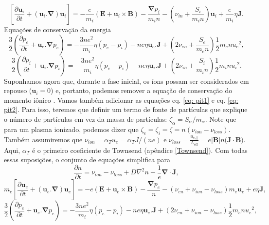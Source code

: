 \documentclass[12pt,oneside,a4paper]{abntex2}
\begin{document}
\begin{equation} 
\left[\frac{\partial \bm{u}_i}{\partial t} + (\bm{u}_i . \bm{\nabla})\bm{u}_i\right] = - \frac{e}{m_i} (\bm{E}+\bm{u}_i \times \bm{B}) - \frac{\bm{\nabla} p_i}{m_i n} - \left( \nu_{in}+\frac{S_i}{m_i n} \right) \bm{u}_i + \frac{e}{m_i}\eta \bm{J} . 
\end{equation}
Equações de conservação da energia
\begin{equation}
\frac{3}{2} \left(\frac{\partial p_e}{\partial t} + \bm{u}_e . \bm{\nabla} p_e\right) = -\frac{3ne^2}{m_i} \eta(p_e-p_i)-ne\eta \bm{u}_e.\bm{J}+\left(2 \nu_{en} + \frac{S_e}{m_e n}  \right) \frac{1}{2}m_en{u_e}^2,
\end{equation}
\begin{equation}
\frac{3}{2} \left(\frac{\partial p_i}{\partial t} + \bm{u}_i . \bm{\nabla} p_i\right) = -\frac{3ne^2}{m_i} \eta(p_e-p_i)-ne\eta \bm{u}_i.\bm{J}+\left( 2 \nu_{in} + \frac{S_i}{m_i n} \right)\frac{1}{2}m_in{u_i}^2 .
\end{equation}
Suponhamos agora que, durante a fase inicial, os íons possam ser considerados em repouso ($\bm{u}_i = 0$) e, portanto, podemos remover a equação de conservação do momento iônico \cite[pg. 402]{bittencourt}. 
Vamos também adicionar as equações eq. \ref{eq: pit1} e eq. \ref{eq: pit2}. 
Para isso, teremos que definir um termo de fonte de partículas que explique o número de partículas em vez da massa de partículas: $\zeta_\alpha = S_\alpha / m_\alpha$. Note que para um plasma ionizado, podemos dizer que $\zeta_e = \zeta_i = \zeta = n(\nu_{ion} - \nu_{loss})$. 
Também assumiremos que $\nu_{ion} = \alpha_T u_e = \alpha_T J / (ne)$ e $\nu_{loss} = \frac{u_{e, ||}}{L_{\mathrm{eff}} }= e |\bm{B}| n \big( \bm{J} \cdot \bm{B}  \big)$. 
Aqui, $\alpha_T$ é o primeiro coeficiente de Townsend (apêndice \ref{Townsend}). Com todas essas suposições, o conjunto de equações simplifica para
\begin{equation}
\frac{\partial n}{\partial t} = \nu_{ion} - \nu_{loss}+D\nabla^2n + \frac{1}{e} \bm{\nabla} \cdot \bm{J},
\end{equation}
\begin{equation}
m_e\left[\frac{\partial \bm{u}_e}{\partial t} + (\bm{u}_e . \bm{\nabla})\bm{u}_e \right] = - e (\bm{E}+\bm{u}_e \times \bm{B}) - \frac{\bm{\nabla} p_e}{n} -(\nu_{en}+\nu_{ion}-\nu_{loss})m_e \bm{u}_e+ e\eta \bm{J}, 
\end{equation}
\begin{equation}
\frac{3}{2} \left(\frac{\partial p_e}{\partial t} + \bm{u}_e . \bm{\nabla} p_e \right) = -\frac{3ne^2}{m_i} \eta(p_e-p_i)-ne\eta \bm{u}_e.\bm{J}+(2 \nu_{en} + \nu_{ion} - \nu_{loss} )\frac{1}{2}m_en{u_e}^2,
\end{equation}
\end{document}
